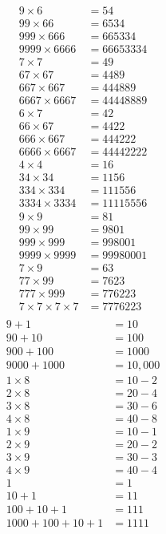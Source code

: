 \begin{align*}
9 \times 6 &= 54\\
99 \times 66 &= 6534\\
999 \times 666 &= 665334 \\
9999 \times 6666 &= 66653334\\[0.4cm]
7\times 7 &= 49\\ %
67 \times 67 &= 4489\\
667 \times 667 &= 444889 \\
6667 \times 6667 &= 44448889\\[0.4cm]
6\times 7 &= 42\\
66 \times 67 &= 4422 \\
666 \times 667 &= 444222\\
6666 \times 6667 &= 44442222\\[0.4cm]
4\times 4 &= 16\\ %
34 \times 34 &= 1156\\
334 \times 334 &= 111556\\
3334 \times 3334 &= 11115556\\[0.4cm]
9\times 9 &= 81\\ %
99\times 99&= 9801\\
999 \times 999 &= 998001\\
9999 \times 9999 &= 99980001\\[0.4cm]
7 \times 9 &= 63\\ %
77 \times 99 &= 7623\\
777 \times 999 &= 776223\\
7\times 7\times 7 \times 7 &= 7776223\\[0.4cm]
\end{align*}
\begin{align*}
9+1 &= 10\\ 
90+10 &= 100\\
900+100 &= 1000\\
9000+1000 &= 10,000\\[0.4cm]
1 \times 8 &= 10-2 \\%
2 \times 8 &= 20-4 \\
3 \times 8 &= 30-6 \\
4 \times 8 &= 40-8 \\[0.4cm]
1 \times 9 &= 10-1\\%
2 \times 9 &= 20-2 \\
3 \times 9 &= 30-3\\
4 \times 9 &= 40-4\\[0.4cm]
1 &= 1\\%
10+1 &= 11\\
100+10+1 &= 111\\
1000+100+10+1 &= 1111
\end{align*}

